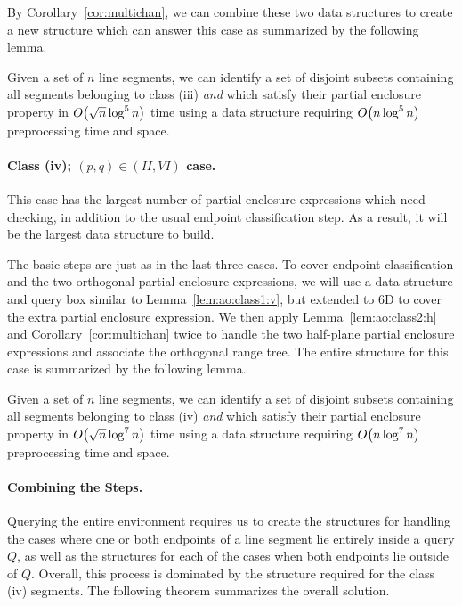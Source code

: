 By Corollary~\ref{cor:multichan}, we can combine these two data structures to create a new structure which can answer this case as summarized by the following lemma.

\begin{lemma}
\label{lem:ao:class3:c}
Given a set of $n$ line segments, we can identify a set of disjoint subsets containing all segments belonging to class (iii) \emph{and} which satisfy their partial enclosure property in $O\!\left(\sqrt{n}\log^5{n}\right)$ time using a data structure requiring $O\!\left(n\log^5{n}\right)$ preprocessing time and space.
\end{lemma}


\paragraph{Class (iv); $(p, q) \in (II, VI)$ case.} 
This case has the largest number of partial enclosure expressions which need checking, in addition to the usual endpoint classification step. 
As a result, it will be the largest data structure to build.

The basic steps are just as in the last three cases. 
To cover endpoint classification and the two orthogonal partial enclosure expressions, we will use a data structure and query box similar to Lemma~\ref{lem:ao:class1:v}, but extended to 6D to cover the extra partial enclosure expression.
We then apply Lemma~\ref{lem:ao:class2:h} and Corollary~\ref{cor:multichan} twice to handle the two half-plane partial enclosure expressions and associate the orthogonal range tree. 
The entire structure for this case is summarized by the following lemma.

\begin{lemma}
\label{lem:ao:class4:c}
Given a set of $n$ line segments, we can identify a set of disjoint subsets containing all segments belonging to class (iv) \emph{and} which satisfy their partial enclosure property in $O\!\left(\sqrt{n}\log^7{n}\right)$ time using a data structure requiring $O\!\left(n\log^7{n}\right)$ preprocessing time and space.
\end{lemma}


\paragraph{Combining the Steps.} 

Querying the entire environment requires us to create the structures for handling the cases where one or both endpoints of a line segment lie entirely inside a query $Q$, as well as the structures for each of the cases when both endpoints lie outside of $Q$. 
Overall, this process is dominated by the structure required for the class (iv) segments. 
The following theorem summarizes the overall solution.

